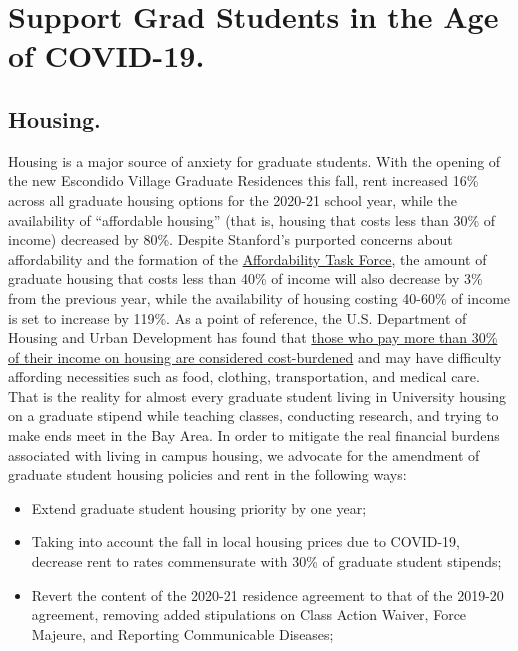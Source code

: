 \documentclass[12pt, titlepage, letterpaper]{article}
\begin{document}
\newpage
\section*{Support Grad Students in the Age of COVID-19.}
%
\vspace{0.3em}\hline\hline

\subsection*{Housing.}
%

Housing is a major source of anxiety for graduate students. With the opening of the new Escondido Village Graduate Residences this fall, rent increased 16\% across all graduate housing options for the 2020-21 school year, while the availability of “affordable housing” (that is, housing that costs less than 30\% of income) decreased by 80\%. Despite Stanford’s purported concerns about affordability and the formation of the \href{https://www.stanforddaily.com/2020/02/19/after-1-5-years-all-stanfords-affordability-task-force-has-to-offer-are-false-solutions/}{Affordability Task Force}, the amount of graduate housing that costs less than 40\% of income will also decrease by 3\% from the previous year, while the availability of housing costing 40-60\% of income is set to increase by 119\%. As a point of reference, the U.S. Department of Housing and Urban Development has found that \href{https://www.huduser.gov/portal/pdredge/pdr_edge_featd_article_092214.html}{those who pay more than 30\% of their income on housing are considered cost-burdened} and may have difficulty affording necessities such as food, clothing, transportation, and medical care. That is the reality for almost every graduate student living in University housing on a graduate stipend while teaching classes, conducting research, and trying to make ends meet in the Bay Area. In order to mitigate the real financial burdens associated with living in campus housing, we advocate for the amendment of graduate student housing policies and rent in the following ways:

\begin{itemize}[noitemsep]
    \item Extend graduate student housing priority by one year;
    \item Taking into account the fall in local housing prices due to COVID-19, decrease rent to rates commensurate with 30\% of graduate student stipends;
    \item Revert the content of the 2020-21 residence agreement to that of the 2019-20 agreement, removing added stipulations on Class Action Waiver, Force Majeure, and Reporting Communicable Diseases;
\end{itemize}
\end{document}
